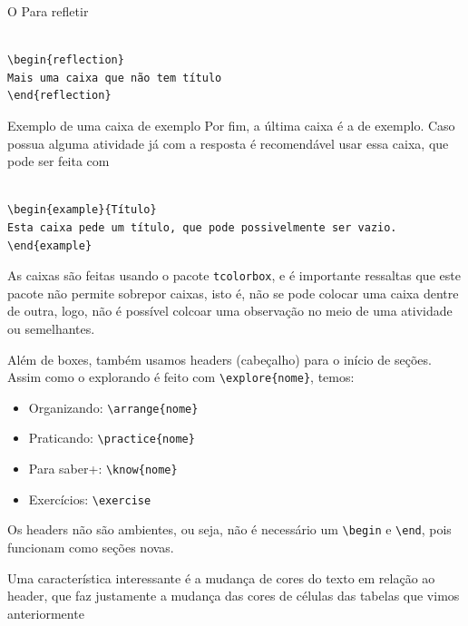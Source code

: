 \begin{reflection}
O Para refletir

\begin{verbatim}

\begin{reflection}
Mais uma caixa que não tem título
\end{reflection}
\end{verbatim}
\end{reflection}

\begin{example}{Exemplo de uma caixa de exemplo}
Por fim, a última caixa é a de exemplo. Caso possua alguma atividade já com a resposta é recomendável usar essa caixa, que pode ser feita com
\begin{verbatim}

\begin{example}{Título}
Esta caixa pede um título, que pode possivelmente ser vazio.
\end{example}
\end{verbatim}
\end{example}

\begin{observation}{}
As caixas são feitas usando o pacote \verb|tcolorbox|, e é importante ressaltas que este pacote não permite sobrepor caixas, isto é, não se pode colocar uma caixa dentre de outra, logo, não é possível colcoar uma observação no meio de uma atividade ou semelhantes.
\end{observation}


Além de boxes, também usamos headers (cabeçalho) para o início de seções. Assim como o explorando é feito com \verb|\explore{nome}|, temos:

\begin{itemize}
\item Organizando: \verb|\arrange{nome}|
\item Praticando: \verb|\practice{nome}|
\item Para saber+: \verb|\know{nome}|
\item Exercícios: \verb|\exercise|
\end{itemize}

Os headers não são ambientes, ou seja, não é necessário um \verb|\begin| e \verb|\end|, pois funcionam como seções novas. 

Uma característica interessante é a mudança de cores do texto em relação ao header, que faz justamente a mudança das cores de células das tabelas que vimos anteriormente

